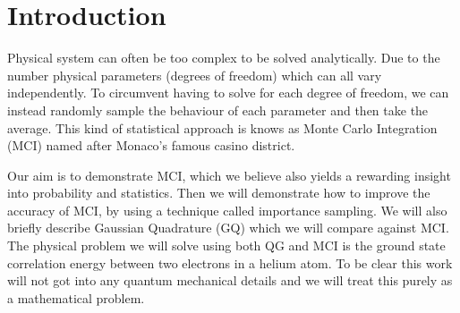 \section{Introduction}

Physical system can often be too complex to be solved analytically. Due to the
number physical parameters (degrees of freedom) which can all vary
independently. To circumvent having to solve for each degree of
freedom, we can instead randomly sample the behaviour of each parameter
and then take the average. This kind of statistical approach is knows as Monte Carlo
Integration (MCI) named after Monaco's famous casino district. 
  
Our aim is to demonstrate MCI, which we believe also yields
a rewarding insight into probability and statistics.  Then we
will demonstrate how to improve the accuracy of MCI, by
using a technique called importance sampling. We will also briefly describe
Gaussian Quadrature (GQ) which we will compare against MCI. The
physical problem we will solve using both QG and MCI is the ground state
correlation energy between two electrons in a helium atom. To be clear this work
will not got into any quantum mechanical details and we will treat this purely
as a mathematical problem. 